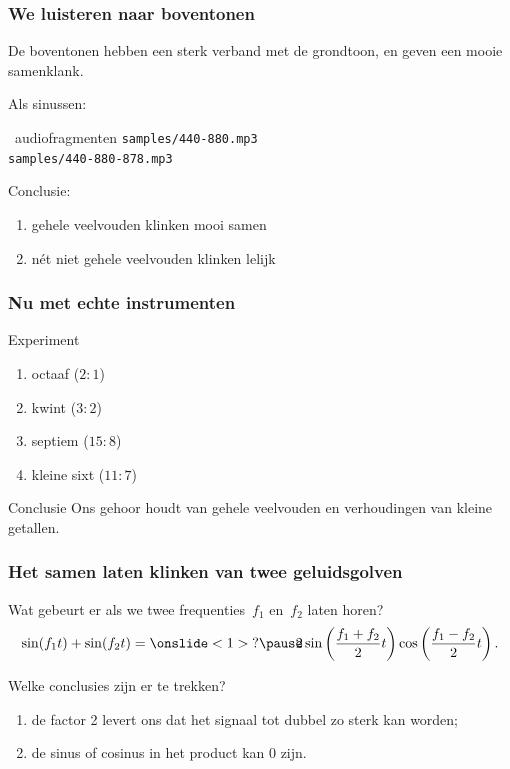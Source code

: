 \documentclass[compress, darktitle, framenumber, totalframenumber]{beamer}
\begin{document}
\begin{frame}
  \frametitle{We luisteren naar boventonen}

  De boventonen hebben een sterk verband met de grondtoon, en geven een mooie samenklank.

  \pause

  Als sinussen:
  \begin{block}{\twonotes\ audiofragmenten}
    \texttt{samples/440-880.mp3} \\
    \texttt{samples/440-880-878.mp3} \\
  \end{block}

  \pause
  Conclusie:
  \begin{enumerate}
    \item gehele veelvouden klinken mooi samen
    \item n\'et niet gehele veelvouden klinken lelijk
  \end{enumerate}
\end{frame}

\begin{frame}
  \frametitle{Nu met echte instrumenten}

  \begin{block}{Experiment}
    \begin{enumerate}
      \item octaaf ($2:1$)
        \pause
      \item kwint ($3:2$)
        \pause
      \item septiem ($15:8$)
        \pause
      \item kleine sixt ($11:7$)
    \end{enumerate}
  \end{block}

  \pause

  \begin{alertblock}{Conclusie}
    Ons gehoor houdt van gehele veelvouden en verhoudingen van kleine getallen.
  \end{alertblock}
\end{frame}

\begin{frame}
  \frametitle{Het samen laten klinken van twee geluidsgolven}

  Wat gebeurt er als we twee frequenties~$f_1$ en~$f_2$ laten horen?
  \begin{equation}
    \sin(f_1t)+\sin(f_2t)=\onslide<1>{?}\pause\!\!\!2\sin\left( \frac{f_1+f_2}{2}t \right)\cos\left( \frac{f_1-f_2}{2}t \right).
  \end{equation}

  \pause

  Welke conclusies zijn er te trekken?

  \pause

  \begin{enumerate}
    \item de factor 2 levert ons dat het signaal tot dubbel zo sterk kan worden;
    \item de sinus of cosinus in het product kan 0 zijn.
  \end{enumerate}

\end{frame}
\end{document}
